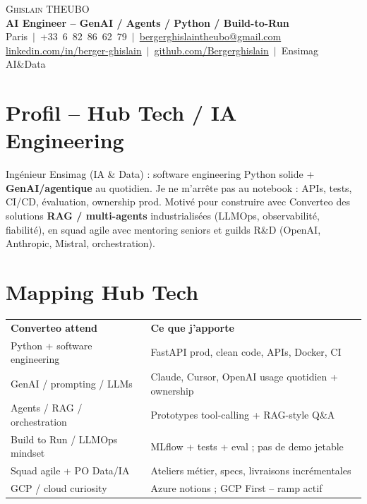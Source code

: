 \documentclass[a4paper,10.5pt]{article}
\begin{document}
\begin{center}
{\Huge \scshape Ghislain THEUBO}\\[2pt]
\textbf{AI Engineer -- GenAI / Agents / Python / Build-to-Run}\\[2pt]
\small Paris $\,|\,$ +33~6~82~86~62~79 $\,|\,$ \href{mailto:bergerghislaintheubo@gmail.com}{bergerghislaintheubo@gmail.com}\\[1pt]
\href{https://www.linkedin.com/in/berger-ghislain}{linkedin.com/in/berger-ghislain} $\,|\,$ \href{https://github.com/Bergerghislain}{github.com/Bergerghislain} $\,|\,$ Ensimag AI\&Data
\end{center}

\section{Profil -- Hub Tech / IA Engineering}
\small{
Ing\'enieur Ensimag (IA \& Data) : software engineering Python solide + \textbf{GenAI/agentique} au quotidien.
Je ne m'arr\^ete pas au notebook : APIs, tests, CI/CD, \'evaluation, ownership prod.
Motiv\'e pour construire avec Converteo des solutions \textbf{RAG / multi-agents} industrialis\'ees
(LLMOps, observabilit\'e, fiabilit\'e), en squad agile avec mentoring seniors et guilds R\&D
(OpenAI, Anthropic, Mistral, orchestration).
}

\section{Mapping Hub Tech}
\small{
\begin{tabular*}{0.97\textwidth}{@{}p{}@{\extracolsep{\fill}}p{}@{}}
\textbf{Converteo attend} & \textbf{Ce que j'apporte} \\
Python + software engineering & FastAPI prod, clean code, APIs, Docker, CI \\
GenAI / prompting / LLMs & Claude, Cursor, OpenAI usage quotidien + ownership \\
Agents / RAG / orchestration & Prototypes tool-calling + RAG-style Q\&A \\
Build to Run / LLMOps mindset & MLflow + tests + eval ; pas de demo jetable \\
Squad agile + PO Data/IA & Ateliers m\'etier, specs, livraisons incr\'ementales \\
GCP / cloud curiosity & Azure notions ; GCP First -- ramp actif \\
\end{tabular*}
}
\end{document}
